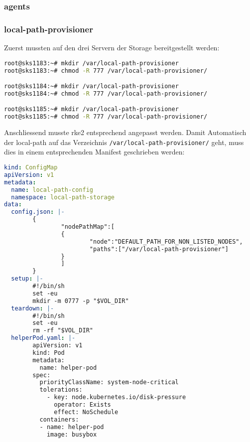 \subsubsection{agents}

\subsubsection{local-path-provisioner}
Zuerst mussten auf den drei Servern der Storage bereitgestellt werden:
\lstset{style=gra_codestyle}
\begin{lstlisting}[language=bash, caption=local-path-storage auf Linux Bereitstellen,captionpos=b,label={lst:local-path-storage-provide},breaklines=true]
root@sks1183:~# mkdir /var/local-path-provisioner
root@sks1183:~# chmod -R 777 /var/local-path-provisioner/

root@sks1184:~# mkdir /var/local-path-provisioner
root@sks1184:~# chmod -R 777 /var/local-path-provisioner/

root@sks1185:~# mkdir /var/local-path-provisioner
root@sks1185:~# chmod -R 777 /var/local-path-provisioner/
\end{lstlisting}

Anschliessend musste rke2 entsprechend angepasst werden.
Damit Automatisch der local-path auf das Verzeichnis \texttt{/var/local-path-provisioner/} geht, muss dies in einem entsprechenden Manifest geschrieben werden:
\lstset{style=gra_codestyle}
\begin{lstlisting}[language=yaml, caption=local-path-provisioner definieren,captionpos=b,label={lst:local-path-provisioner.yaml},breaklines=true]
kind: ConfigMap
apiVersion: v1
metadata:
  name: local-path-config
  namespace: local-path-storage
data:
  config.json: |-
        {
                "nodePathMap":[
                {
                        "node":"DEFAULT_PATH_FOR_NON_LISTED_NODES",
                        "paths":["/var/local-path-provisioner"]
                }
                ]
        }
  setup: |-
        #!/bin/sh
        set -eu
        mkdir -m 0777 -p "$VOL_DIR"
  teardown: |-
        #!/bin/sh
        set -eu
        rm -rf "$VOL_DIR"
  helperPod.yaml: |-
        apiVersion: v1
        kind: Pod
        metadata:
          name: helper-pod
        spec:
          priorityClassName: system-node-critical
          tolerations:
            - key: node.kubernetes.io/disk-pressure
              operator: Exists
              effect: NoSchedule
          containers:
          - name: helper-pod
            image: busybox
\end{lstlisting}


